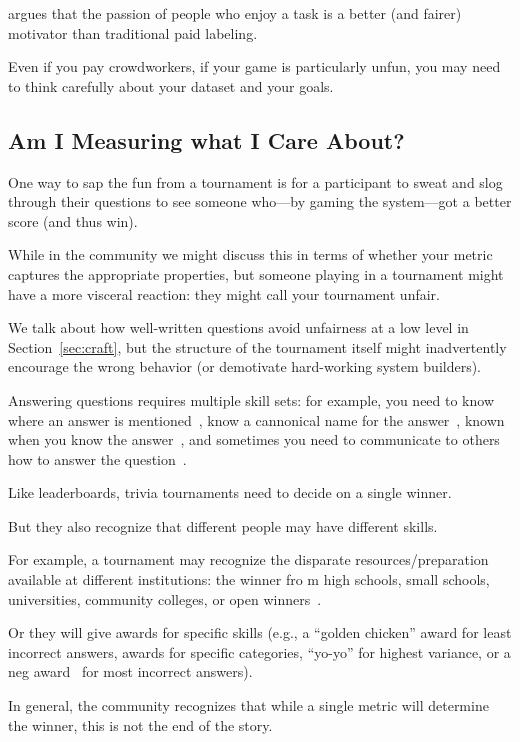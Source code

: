  argues that the passion of people who enjoy a task is a better (and fairer) motivator than traditional paid labeling.

Even if you pay crowdworkers, if your game is particularly unfun, you may need to think carefully about your dataset and your goals.

\subsection{Am I Measuring what I Care About?}

One way to sap the fun from a tournament is for a participant to sweat and slog through their questions to see someone who---by gaming the system---got a better score (and thus win).

While in the  community we might discuss this in terms of whether your metric captures the appropriate properties, but someone playing in a tournament might have a more visceral reaction: they might call your tournament unfair.

We talk about how well-written questions avoid unfairness at a low level in Section~\ref{sec:craft}, but the structure of the tournament itself might inadvertently encourage the wrong behavior (or demotivate hard-working system builders).

Answering questions requires multiple skill sets: for example, you need to know where an answer is mentioned~\cite{hermann-15}, know a cannonical name for the answer~\cite{yih-15}, known when you know the answer~\cite{rajpurkar-18}, and sometimes you need to communicate to others how to answer the question~\cite{fever-18}.

Like  leaderboards, trivia tournaments need to decide on a single winner.

But they also recognize that different people may have different skills.

For example, a tournament may recognize the disparate resources/preparation available at different institutions: the winner fro m high schools, small schools, universities, community colleges, or open winners~\cite{naqt-eligibility}.

Or they will give awards for specific skills (e.g., a ``golden chicken'' award for least incorrect answers, awards for specific categories, ``yo-yo'' for highest variance, or a neg award~\cite{neg-award} for most incorrect answers).

In general, the community recognizes that while a single metric will determine the winner, this is not the end of the story.

